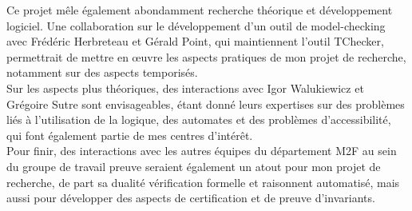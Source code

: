Ce projet mêle également abondamment recherche théorique et
développement logiciel. Une collaboration sur le développement d'un outil de
model-checking avec Frédéric Herbreteau et Gérald Point, qui maintiennent
l'outil TChecker, permettrait de mettre en œuvre les aspects pratiques de mon
projet de recherche, notamment sur des aspects temporisés.\\

Sur les aspects plus théoriques, des interactions avec Igor
Walukiewicz et Grégoire Sutre sont envisageables, étant donné leurs expertises
sur des problèmes liés à l'utilisation de la logique, des automates et des
problèmes d'accessibilité, qui font également partie de mes centres d'intérêt.\\

Pour finir, des interactions avec les autres équipes du département M2F au sein
du groupe de travail \og preuve \fg seraient également un atout pour mon projet
de recherche, de part sa dualité vérification formelle et raisonnent automatisé,
mais aussi pour développer des aspects de certification et de preuve d'invariants.

